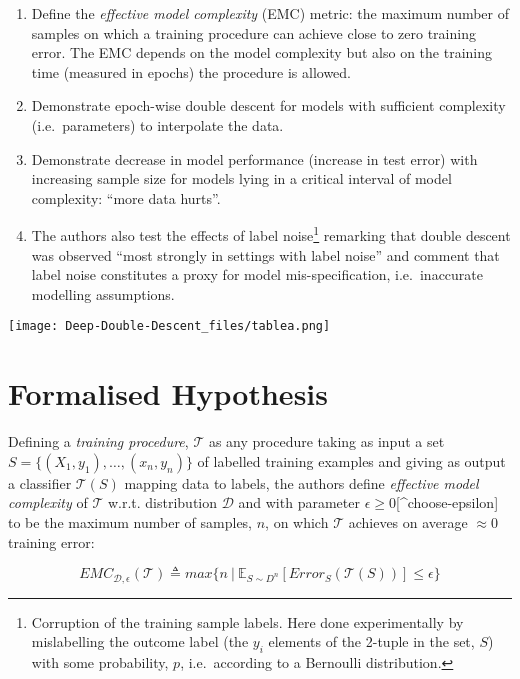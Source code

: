 \documentclass[]{article}
\providecommand{\tightlist}{%
  \setlength{\itemsep}{0pt}\setlength{\parskip}{0pt}}
\begin{document}
\begin{enumerate}
\def\labelenumi{\arabic{enumi}.}
\setcounter{enumi}{1}
\tightlist
\item
  Define the \emph{effective model complexity} (EMC) metric: the maximum
  number of samples on which a training procedure can achieve close to
  zero training error. The EMC depends on the model complexity but also
  on the training time (measured in epochs) the procedure is allowed.\\
\item
  Demonstrate epoch-wise double descent for models with sufficient
  complexity (i.e.~parameters) to interpolate the data.\\
\item
  Demonstrate decrease in model performance (increase in test error)
  with increasing sample size for models lying in a critical interval of
  model complexity: ``more data hurts''.\\
\item
  The authors also test the effects of label noise\footnote{Corruption
    of the training sample labels. Here done experimentally by
    mislabelling the outcome label (the \(y_i\) elements of the 2-tuple
    in the set, \(S\)) with some probability, \(p\), i.e.~according to a
    Bernoulli distribution.} remarking that double descent was observed
  ``most strongly in settings with label noise'' and comment that label
  noise constitutes a proxy for model mis-specification, i.e.~inaccurate
  modelling assumptions.
\end{enumerate}

\texttt{[image: Deep-Double-Descent\_files/tablea.png]}

\section{Formalised Hypothesis}

Defining a \emph{training procedure}, \(\mathcal{T}\) as any procedure
taking as input a set \(S = \{(X_1, y_1), \dots, (x_n, y_n)\}\) of
labelled training examples and giving as output a classifier
\(\mathcal{T}(S)\) mapping data to labels, the authors define
\emph{effective model complexity} of \(\mathcal{T}\) w.r.t. distribution
\(\mathcal{D}\) and with parameter
\(\epsilon \geq 0\){[}\^{}choose-epsilon{]} to be the maximum number of
samples, \(n\), on which \(\mathcal{T}\) achieves on average
\(\approx 0\) training error:

\[EMC_{\mathcal{D}, \epsilon}(\mathcal{T}) \triangleq max\{n\ \vert\ \mathbb{E}_{S \sim D^n}[Error_S(\mathcal{T}(S))] \leq \epsilon \}\]
\end{document}

